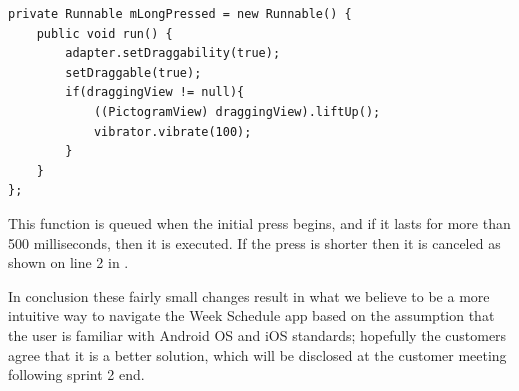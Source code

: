 \begin{lstlisting}[float, floatplacement=b, caption={The longpress function which is queued upon a \texttt{MotionEvent\_Down}, i.e. a touch.}, label={lst:longpress}]
private Runnable mLongPressed = new Runnable() {
    public void run() {
        adapter.setDraggability(true);
        setDraggable(true);
        if(draggingView != null){
            ((PictogramView) draggingView).liftUp();
            vibrator.vibrate(100);
        }
    }
};
\end{lstlisting}

This function is queued when the initial press begins, and if it lasts for more than 500 milliseconds, then it is executed.
If the press is shorter then it is canceled as shown on line 2 in .

\bigskip
In conclusion these fairly small changes result in what we believe to be a more intuitive way to navigate the Week Schedule app based on the assumption that the user is familiar with Android OS and iOS standards; hopefully the customers agree that it is a better solution, which will be disclosed at the customer meeting following sprint 2 end.
